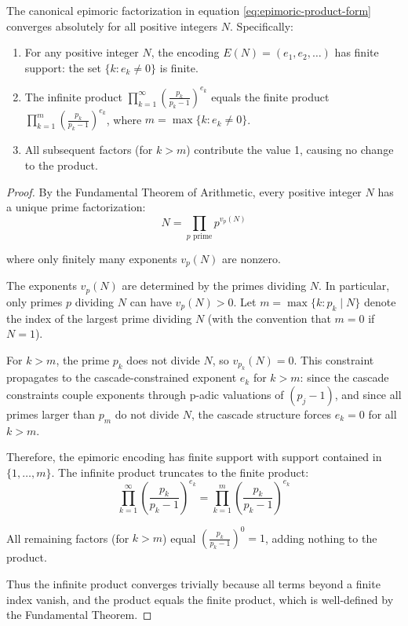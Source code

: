 \begin{lemma}
\label{lem:finite-support-convergence}

The canonical epimoric factorization in equation \eqref{eq:epimoric-product-form} converges absolutely for all positive integers $N$. Specifically:

\begin{enumerate}
\item For any positive integer $N$, the encoding $E(N) = (e_1, e_2, \ldots)$ has finite support: the set $\{k : e_k \neq 0\}$ is finite.
\item The infinite product $\prod_{k=1}^{\infty} \left(\frac{p_k}{p_k - 1}\right)^{e_k}$ equals the finite product $\prod_{k=1}^{m} \left(\frac{p_k}{p_k - 1}\right)^{e_k}$, where $m = \max\{k : e_k \neq 0\}$.
\item All subsequent factors (for $k > m$) contribute the value 1, causing no change to the product.
\end{enumerate}

\end{lemma}

\begin{proof}

By the Fundamental Theorem of Arithmetic, every positive integer $N$ has a unique prime factorization:
\[
N = \prod_{p \text{ prime}} p^{v_p(N)}
\]

where only finitely many exponents $v_p(N)$ are nonzero.

The exponents $v_p(N)$ are determined by the primes dividing $N$. In particular, only primes $p$ dividing $N$ can have $v_p(N) > 0$. Let $m = \max\{k : p_k \mid N\}$ denote the index of the largest prime dividing $N$ (with the convention that $m = 0$ if $N = 1$).

For $k > m$, the prime $p_k$ does not divide $N$, so $v_{p_k}(N) = 0$. This constraint propagates to the cascade-constrained exponent $e_k$ for $k > m$: since the cascade constraints couple exponents through p-adic valuations of $(p_j - 1)$, and since all primes larger than $p_m$ do not divide $N$, the cascade structure forces $e_k = 0$ for all $k > m$.

Therefore, the epimoric encoding has finite support with support contained in $\{1, \ldots, m\}$. The infinite product truncates to the finite product:
\[
\prod_{k=1}^{\infty} \left(\frac{p_k}{p_k - 1}\right)^{e_k} = \prod_{k=1}^{m} \left(\frac{p_k}{p_k - 1}\right)^{e_k}
\]

All remaining factors (for $k > m$) equal $\left(\frac{p_k}{p_k - 1}\right)^0 = 1$, adding nothing to the product.

Thus the infinite product converges trivially because all terms beyond a finite index vanish, and the product equals the finite product, which is well-defined by the Fundamental Theorem.

\end{proof}

